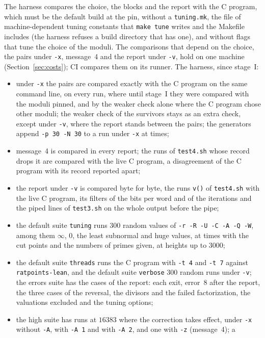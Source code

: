 The harness compares the choice, the blocks and the report with the C program, which must be the
default build at the pin, without a \verb|tuning.mk|, the file of machine-dependent tuning constants
that \verb|make tune| writes and the Makefile includes (the harness refuses a build directory that
has one), and without flags that tune the choice of the moduli. The comparisons that depend on the
choice, the pairs under \verb|-x|, message~4 and the report under \verb|-v|, hold on one machine
(Section~\ref{sec:costs}); CI compares them on its runner. The harness, since stage~I:
\begin{itemize}
  \item under \verb|-x| the pairs are compared exactly with the C program on the same command line,
    on every run, where until stage~I they were compared with the moduli pinned, and by the weaker
    check alone where the C program chose other moduli; the weaker check of the survivors stays as
    an extra check, except under \verb|-v|, where the report stands between the pairs; the
    generators append \verb|-p 30 -N 30| to a run under \verb|-x| at times;
  \item message~4 is compared in every report; the runs of \verb|test4.sh| whose record drops it are
    compared with the live C program, a disagreement of the C program with its record reported
    apart;
  \item the report under \verb|-v| is compared byte for byte, the runs \verb|v()| of \verb|test4.sh|
    with the live C program, its filters of the bits per word and of the iterations and the piped
    lines of \verb|test3.sh| on the whole output before the pipe;
  \item the default suite \verb|tuning| runs $300$ random values of \verb|-r -R -U -C -A -Q -W|,
    among them $\infty$, $0$, the least subnormal and huge values, at times with the cut points and
    the numbers of primes given, at heights up to $3000$;
  \item the default suite \verb|threads| runs the C program with \verb|-t 4| and \verb|-t 7| against
    \verb|ratpoints-lean|, and the default suite \verb|verbose| $300$ random runs under \verb|-v|;
    the errors suite has the cases of the report: each exit, error~8 after the report, the three
    cases of the reversal, the divisors and the failed factorization, the valuations excluded and
    the tuning options;
  \item the high suite has runs at $16383$ where the correction takes effect, under \verb|-x|
    without \verb|-A|, with \verb|-A 1| and with \verb|-A 2|, and one with \verb|-z| (message~4); a

\end{itemize}
